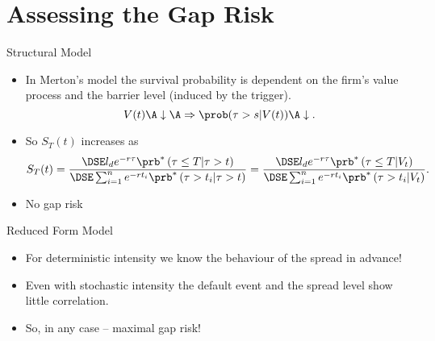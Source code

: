 \section{Assessing the Gap Risk}


{Structural Model}

\begin{itemize}
\item<1-> In Merton's model the survival probability is dependent on the firm's value process and the barrier level (induced by the trigger).
$$
V(t) \A \downarrow \A \Rightarrow \prob(\tau > s |V(t)) \A \downarrow.
$$
\item<2-> So $S_T(t)$ increases as
$$
S_T(t)=\frac{\DSE l_d e^{-r\tau} \prb^*\left(\tau\leq T  | \tau >t\right)} {\DSE\sum_{i=1}^n e^{-rt_i} \prb^*\left(\tau >t_i| \tau >t\right)}
=\frac{\DSE l_d e^{-r\tau} \prb^*\left(\tau\leq T  | V_t \right)} {\DSE\sum_{i=1}^n e^{-rt_i} \prb^*\left(\tau >t_i| V_t\right)}.
$$
\item<3-> No gap risk
\end{itemize}




{Reduced Form Model}

\begin{itemize}
\item<1->
For deterministic intensity we know the behaviour of the spread  in advance!
\item<2->
Even with stochastic intensity the default event and the spread level show little correlation.
\item<3->  So, in any case  -- maximal gap risk!
\end{itemize}








